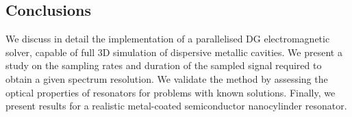 \documentclass[times,11pt]{ACME2015article}
\begin{document}
\begin{normalsize}






%

\section{Conclusions}
We discuss in detail the implementation of a parallelised DG electromagnetic solver, capable of full 3D simulation of dispersive metallic cavities. We present a study on the sampling rates and duration of the sampled signal required to obtain a given spectrum resolution. We validate the method by assessing the optical properties of resonators for problems with known solutions. Finally, we present results for a realistic metal-coated semiconductor nanocylinder resonator.



\end{normalsize}
\end{document}
